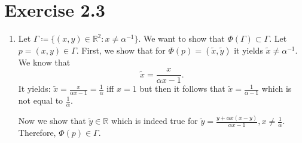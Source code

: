 \documentclass{article}
\theoremstyle{named}
\begin{document}
\section*{Exercise 2.3}
\begin{enumerate}[label=(\roman*)]
	\item Let $\Gamma \coloneqq \{(x,y) \in \mathbb R^2 : x \neq \alpha^{-1}\}$. We want to show that $\Phi(\Gamma) \subset \Gamma$. Let $p = (x,y) \in \Gamma$. First, we show that for $\Phi(p) = (\tilde x, \tilde y)$ it yields $\tilde x \neq \alpha^{-1}$. We know that
	\[
		\tilde x = \frac{x}{\alpha x - 1}.
	\]
	It yields: $\tilde x =  \frac{x}{\alpha x - 1} = \frac{1}{\alpha}$ iff $x = 1$ but then it follows that $\tilde x = \frac{1}{\alpha-1}$ which is not equal to $\frac{1}{\alpha}$. 
	
	Now we show that $\tilde y \in \mathbb R$ which is indeed true for $\tilde y = \frac{y+\alpha x(x-y)}{\alpha x - 1}, x \neq \frac{1}{\alpha}$. Therefore, $\Phi(p) \in \Gamma$.
	

\end{enumerate}
\end{document}
